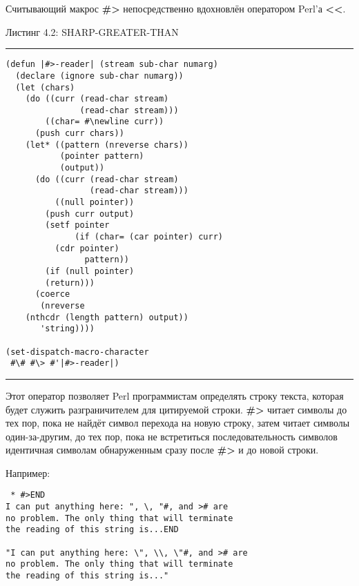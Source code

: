 Считывающий макрос \textbf{\#>} непосредственно вдохновлён оператором Perl'а \textbf{<<}. 

Листинг 4.2: SHARP-GREATER-THAN\label{listing_4.2}
\hrule
\begin{verbatim}
(defun |#>-reader| (stream sub-char numarg)
  (declare (ignore sub-char numarg))
  (let (chars)
    (do ((curr (read-char stream)
               (read-char stream)))
        ((char= #\newline curr))
      (push curr chars))
    (let* ((pattern (nreverse chars))
           (pointer pattern)
           (output))
      (do ((curr (read-char stream)
                 (read-char stream)))
          ((null pointer))
        (push curr output)
        (setf pointer
              (if (char= (car pointer) curr)
		  (cdr pointer)
                pattern))
        (if (null pointer)
	    (return)))
      (coerce
       (nreverse
	(nthcdr (length pattern) output))
       'string))))

(set-dispatch-macro-character
 #\# #\> #'|#>-reader|)
\end{verbatim}
\hrule

Этот оператор позволяет Perl программистам определять строку текста, которая будет служить разграничителем для цитируемой строки. \textbf{\#>} читает символы до тех пор, пока не найдёт символ перехода на новую строку, затем читает символы один-за-другим, до тех пор, пока не встретиться последовательность символов идентичная символам обнаруженным сразу после \textbf{\#>} и до новой строки.

Например:

\begin{verbatim}
 * #>END
I can put anything here: ", \, "#, and ># are
no problem. The only thing that will terminate
the reading of this string is...END

"I can put anything here: \", \\, \"#, and ># are
no problem. The only thing that will terminate
the reading of this string is..."
\end{verbatim}
